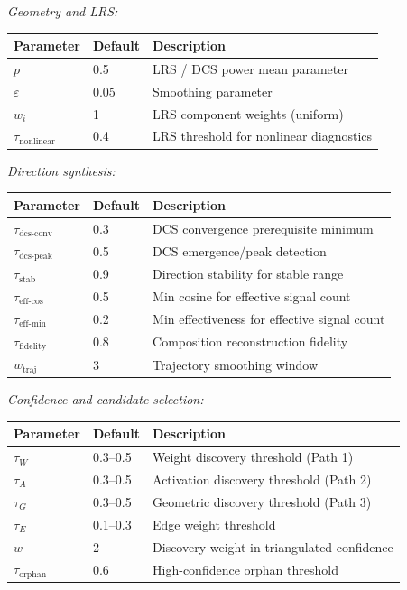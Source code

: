 \documentclass[11pt]{article}
\begin{document}
\noindent\textit{Geometry and LRS:}
\begin{center}
\begin{tabular}{llp{}}
\toprule
\textbf{Parameter} & \textbf{Default} & \textbf{Description} \\
\midrule
$p$ & 0.5 & LRS / DCS power mean parameter \\
$\varepsilon$ & 0.05 & Smoothing parameter \\
$w_i$ & 1 & LRS component weights (uniform) \\
$\tau_{\text{nonlinear}}$ & 0.4 & LRS threshold for nonlinear diagnostics \\
\bottomrule
\end{tabular}
\end{center}

\noindent\textit{Direction synthesis:}
\begin{center}
\begin{tabular}{llp{}}
\toprule
\textbf{Parameter} & \textbf{Default} & \textbf{Description} \\
\midrule
$\tau_{\text{dcs-conv}}$ & 0.3 & DCS convergence prerequisite minimum \\
$\tau_{\text{dcs-peak}}$ & 0.5 & DCS emergence/peak detection \\
$\tau_{\text{stab}}$ & 0.9 & Direction stability for stable range \\
$\tau_{\text{eff-cos}}$ & 0.5 & Min cosine for effective signal count \\
$\tau_{\text{eff-min}}$ & 0.2 & Min effectiveness for effective signal count \\
$\tau_{\text{fidelity}}$ & 0.8 & Composition reconstruction fidelity \\
$w_{\text{traj}}$ & 3 & Trajectory smoothing window \\
\bottomrule
\end{tabular}
\end{center}

\noindent\textit{Confidence and candidate selection:}
\begin{center}
\begin{tabular}{llp{}}
\toprule
\textbf{Parameter} & \textbf{Default} & \textbf{Description} \\
\midrule
$\tau_W$ & 0.3--0.5 & Weight discovery threshold (Path 1) \\
$\tau_A$ & 0.3--0.5 & Activation discovery threshold (Path 2) \\
$\tau_G$ & 0.3--0.5 & Geometric discovery threshold (Path 3) \\
$\tau_E$ & 0.1--0.3 & Edge weight threshold \\
$w$ & 2 & Discovery weight in triangulated confidence \\
$\tau_{\text{orphan}}$ & 0.6 & High-confidence orphan threshold \\
\bottomrule
\end{tabular}
\end{center}
\end{document}

